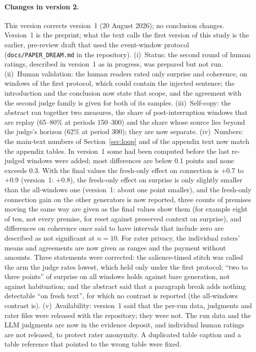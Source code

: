 \documentclass[11pt]{article}
\begin{document}
\paragraph{Changes in version 2.} This version corrects version~1 (20 August
2026); no conclusion changes. Version~1 is the preprint; what the text calls
the first version of this study is the earlier, pre-review draft that used
the event-window protocol (\texttt{docs/PAPER\_DREAM.md} in the repository).
(i)~Status: the second round of human ratings, described in version~1 as in
progress, was prepared but not run. (ii)~Human validation: the human readers rated only surprise and coherence, on windows
of the first protocol, which could contain the injected sentence; the
introduction and the conclusion now state that scope, and the agreement with
the second judge family is given for both of its samples. (iii)~Self-copy:
the abstract ran together two measures, the share of post-interruption
windows that are replay (65--80\% at periods 150--300) and the share whose
source lies beyond the judge's horizon (62\% at period 300); they are now
separate. (iv)~Numbers: the main-text numbers of Section~\ref{sec:loop} and
of the appendix text now match the appendix tables. In version~1 some had been computed before the last re-judged
windows were added; most differences are below 0.1 points and none exceeds
0.3. With the final values the fresh-only effect on connection is +0.7 to
+0.9 (version~1: +0.8), the fresh-only effect on surprise is only slightly
smaller than the all-windows one (version~1: about one point smaller), and
the fresh-only connection gain on the other generators is now reported, three
counts of premises moving the same way are given as the final values show them
(for example eight of ten, not every premise, for reset against preserved context on
surprise), and differences on coherence once said to have intervals that include
zero are described as not significant at $n=10$. For rater privacy, the individual
raters' means and agreements are now given as ranges and the payment without
amounts. Three statements were corrected: the salience-timed stitch was called the
arm the judge rates lowest, which held only under the first protocol;
``two to three points'' of surprise on all windows holds against bare
generation, not against habituation; and the abstract said that a paragraph
break adds nothing detectable ``on fresh text'', for which no contrast is
reported (the all-windows contrast is).
(v)~Availability: version~1 said that the per-run data, judgments and rater
files were released with the repository; they were not. The run data and the
LLM judgments are now in the evidence deposit, and individual human ratings
are not released, to protect rater anonymity. A duplicated table caption and
a table reference that pointed to the wrong table were fixed.




\appendix


\end{document}
